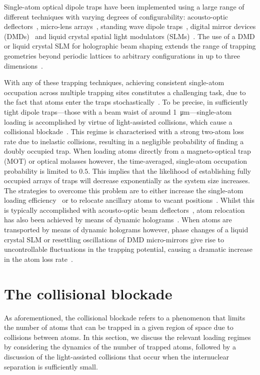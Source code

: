 \documentclass[../Thesis-IJspeert.tex]{subfiles}
\begin{document}
Single-atom optical dipole traps have been implemented using a large range of different techniques with varying degrees of configurability: acousto-optic deflectors~\cite{Endres2016, Bernien2017}, micro-lens arrays~\cite{OhldeMello2019}, standing wave dipole traps~\cite{Alt2003, Gallego2018}, digital mirror devices (DMDs)~\cite{Stuart2018} and liquid crystal spatial light modulators (SLMs)~\cite{Bergamini2004, Kim2016}. The use of a DMD or liquid crystal SLM for holographic beam shaping extends the range of trapping geometries beyond periodic lattices to arbitrary configurations in up to three dimensions~\cite{Barredo2018}.

With any of these trapping techniques, achieving consistent single-atom occupation across multiple trapping sites constitutes a challenging task, due to the fact that atoms enter the traps stochastically~\cite{Grimm2000}. To be precise, in sufficiently tight dipole traps---those with a beam waist of around \SI{1}{\micro\meter}---single-atom loading is accomplished by virtue of light-assisted collisions, which cause a collisional blockade~\cite{Schlosser2002}. This regime is characterised with a strong two-atom loss rate due to inelastic collisions, resulting in a negligible probability of finding a doubly occupied trap. When loading atoms directly from a magneto-optical trap (MOT) or optical molasses however, the time-averaged, single-atom occupation probability is limited to $0.5$. This implies that the likelihood of establishing fully occupied arrays of traps will decrease exponentially as the system size increases. The strategies to overcome this problem are to either increase the single-atom loading efficiency~\cite{Fung2014} or to relocate ancillary atoms to vacant positions~\cite{Vala2005}. Whilst this is typically accomplished with acousto-optic beam deflectors~\cite{Barredo2018}, atom relocation has also been achieved by means of dynamic holograms~\cite{Kim2016,Kim2019}. When atoms are transported by means of dynamic holograms however, phase changes of a liquid crystal SLM or resettling oscillations of DMD micro-mirrors give rise to uncontrollable fluctuations in the trapping potential, causing a dramatic increase in the atom loss rate~\cite{Stuart2018,McGloin2003}.

\section{The collisional blockade}
\label{collisionalblockade}
As aforementioned, the collisional blockade refers to a phenomenon that limits the number of atoms that can be trapped in a given region of space due to collisions between atoms. In this section, we discuss the relevant loading regimes by considering the dynamics of the number of trapped atoms, followed by a discussion of the light-assisted collisions that occur when the internuclear separation is sufficiently small.
\end{document}
